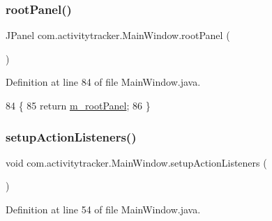 \subsubsection{\texorpdfstring{root\+Panel()}{rootPanel()}}
{\footnotesize\ttfamily J\+Panel com.\+activitytracker.\+Main\+Window.\+root\+Panel (\begin{DoxyParamCaption}{ }\end{DoxyParamCaption})\hspace{0.3cm}{\ttfamily [package]}}



Definition at line 84 of file Main\+Window.\+java.


\begin{DoxyCode}
84                        \{
85         \textcolor{keywordflow}{return} \mbox{\hyperlink{classcom_1_1activitytracker_1_1_main_window_ac3d61c032aef87f12b1ae6f7dbf482c3}{m\_rootPanel}};
86     \}
\end{DoxyCode}
\mbox{\label{classcom_1_1activitytracker_1_1_main_window_a76b3e8567b228ccd26f09c15ebaddb72}} 
\subsubsection{\texorpdfstring{setup\+Action\+Listeners()}{setupActionListeners()}}
{\footnotesize\ttfamily void com.\+activitytracker.\+Main\+Window.\+setup\+Action\+Listeners (\begin{DoxyParamCaption}{ }\end{DoxyParamCaption})\hspace{0.3cm}{\ttfamily [private]}}



Definition at line 54 of file Main\+Window.\+java.


